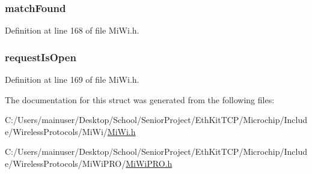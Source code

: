 \subsubsection[{match\+Found}]{ match\+Found}\label{struct___o_p_e_n___s_o_c_k_e_t_1_1___o_p_e_n___s_o_c_k_e_t___s_t_a_t_u_s_1_1___o_p_e_n___s_o_c_k_e_t___s_t_a_t_u_s__bits_a51f218a3fd7a39aeec80c8683259f988}


Definition at line 168 of file Mi\+Wi.\+h.

\hypertarget{struct___o_p_e_n___s_o_c_k_e_t_1_1___o_p_e_n___s_o_c_k_e_t___s_t_a_t_u_s_1_1___o_p_e_n___s_o_c_k_e_t___s_t_a_t_u_s__bits_a74aa4b7a8e475e65cee9f6c0f4e8193d}{}
\subsubsection[{request\+Is\+Open}]{ request\+Is\+Open}\label{struct___o_p_e_n___s_o_c_k_e_t_1_1___o_p_e_n___s_o_c_k_e_t___s_t_a_t_u_s_1_1___o_p_e_n___s_o_c_k_e_t___s_t_a_t_u_s__bits_a74aa4b7a8e475e65cee9f6c0f4e8193d}


Definition at line 169 of file Mi\+Wi.\+h.



The documentation for this struct was generated from the following files\+:\begin{DoxyCompactItemize}
\item 
C\+:/\+Users/mainuser/\+Desktop/\+School/\+Senior\+Project/\+Eth\+Kit\+T\+C\+P/\+Microchip/\+Include/\+Wireless\+Protocols/\+Mi\+Wi/\hyperlink{_mi_wi_8h}{Mi\+Wi.\+h}\item 
C\+:/\+Users/mainuser/\+Desktop/\+School/\+Senior\+Project/\+Eth\+Kit\+T\+C\+P/\+Microchip/\+Include/\+Wireless\+Protocols/\+Mi\+Wi\+P\+R\+O/\hyperlink{_mi_wi_p_r_o_8h}{Mi\+Wi\+P\+R\+O.\+h}\end{DoxyCompactItemize}

